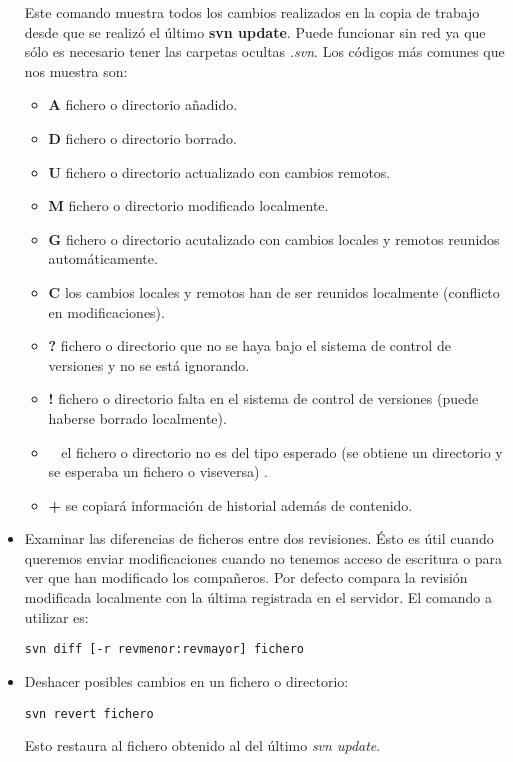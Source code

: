 \begin{itemize}
Este comando muestra todos los cambios realizados en la copia de
trabajo desde que se realizó el último \textbf{svn update}. Puede
funcionar sin red ya que sólo es necesario tener las carpetas ocultas
\textit{.svn}. Los códigos más comunes que nos muestra son: 
\begin{itemize}
\item \textbf{A} fichero o directorio añadido.
\item \textbf{D} fichero o directorio borrado.
\item \textbf{U} fichero o directorio actualizado con cambios
  remotos. 
\item \textbf{M} fichero o directorio modificado localmente.
\item \textbf{G} fichero o directorio acutalizado con cambios locales
  y remotos reunidos automáticamente. 
\item \textbf{C} los cambios locales y remotos han de ser reunidos
  localmente (conflicto en modificaciones). 
\item \textbf{?} fichero o directorio que no se haya bajo el sistema
  de control de versiones y no se está ignorando. 
\item \textbf{!} fichero o directorio falta en el sistema de control
  de versiones (puede haberse borrado localmente). 
\item \textbf{~} el fichero o directorio no es del tipo esperado (se
  obtiene un directorio y se esperaba un fichero o viseversa) .
\item \textbf{+} se copiará información de historial además de
  contenido. 
\end{itemize}

\item Examinar las diferencias de ficheros entre dos revisiones. Ésto
  es útil cuando queremos enviar modificaciones cuando no tenemos
  acceso de escritura o para ver que han modificado los
  compañeros. Por defecto compara la revisión modificada localmente
  con la última registrada en el servidor. El comando a utilizar es: 
\begin{lstlisting}[style=consola]
svn diff [-r revmenor:revmayor] fichero
\end{lstlisting}

\item Deshacer posibles cambios en un fichero o directorio:
\begin{lstlisting}[style=consola]
svn revert fichero
\end{lstlisting}
Esto restaura al fichero obtenido al del último \textit{svn update}.


\end{itemize}

